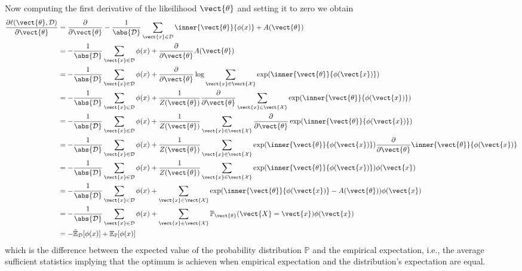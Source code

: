     Now computing the first derivative of the likeilihood \wrt $\vect{\theta}$ and setting it to zero we obtain
    \begin{equation}
        \label{eq:likelihood_der}
        \begin{split}
            \frac{\partial \ell(\vect{\theta}, \mathcal{D})}{\partial \vect{\theta}} &=  \frac{\partial}{\partial \vect{\theta}}  - \frac{1}{\abs{\mathcal{D}}} \sum_{\vect{x} \in \mathcal{D}} \inner{\vect{\theta}}{\phi(x)} + A(\vect{\theta})\\
            &= - \frac{1}{\abs{\mathcal{D}}}  \sum_{\vect{x} \in \mathcal{D}} \phi(x) +  \frac{\partial}{\partial \vect{\theta}}  A(\vect{\theta}) \\
            &= - \frac{1}{\abs{\mathcal{D}}}  \sum_{\vect{x} \in \mathcal{D}} \phi(x) +  \frac{\partial}{\partial \vect{\theta}}  \log \sum_{\vect{x} \in \vect{\mathcal{X}}} \exp(\inner{\vect{\theta}}{\phi(\vect{x})})\\
            &= - \frac{1}{\abs{\mathcal{D}}}  \sum_{\vect{x} \in \mathcal{D}} \phi(x) +  \frac{1}{Z(\vect{\theta})}\frac{\partial}{\partial \vect{\theta}}  \sum_{\vect{x} \in \vect{\mathcal{X}}} \exp(\inner{\vect{\theta}}{\phi(\vect{x})})\\
            &= - \frac{1}{\abs{\mathcal{D}}}  \sum_{\vect{x} \in \mathcal{D}} \phi(x) +  \frac{1}{Z(\vect{\theta})} \sum_{\vect{x} \in \vect{\mathcal{X}}}  \frac{\partial}{\partial \vect{\theta}}  \exp(\inner{\vect{\theta}}{\phi(\vect{x})})\\
            &= - \frac{1}{\abs{\mathcal{D}}}  \sum_{\vect{x} \in \mathcal{D}} \phi(x) +  \frac{1}{Z(\vect{\theta})} \sum_{\vect{x} \in \vect{\mathcal{X}}} \exp(\inner{\vect{\theta}}{\phi(\vect{x})}) \frac{\partial}{\partial \vect{\theta}}  \inner{\vect{\theta}}{\phi(\vect{x})}\\
            &= - \frac{1}{\abs{\mathcal{D}}}  \sum_{\vect{x} \in \mathcal{D}} \phi(x) +  \frac{1}{Z(\vect{\theta})} \sum_{\vect{x} \in \vect{\mathcal{X}}} \exp(\inner{\vect{\theta}}{\phi(\vect{x})}) \phi(\vect{x})\\
            &= - \frac{1}{\abs{\mathcal{D}}}  \sum_{\vect{x} \in \mathcal{D}} \phi(x) + \sum_{\vect{x} \in \vect{\mathcal{X}}} \exp(\inner{\vect{\theta}}{\phi(\vect{x})} - A(\vect{\theta})) \phi(\vect{x})\\
            &= - \frac{1}{\abs{\mathcal{D}}}  \sum_{\vect{x} \in \mathcal{D}} \phi(x) + \sum_{\vect{x} \in \vect{\mathcal{X}}} \mathbb{P}_{\vect{\theta}}(\vect{X} = \vect{x}) \phi(\vect{x})\\
            &=  - \tilde{\mathbb{E}}_{\mathcal{D}}[\phi(x)] + \mathbb{E}_{\mathbb{P}}[\phi(x)]
        \end{split}
    \end{equation}
    which is the difference between the expected value of the probability distribution $\mathbb{P}$ and the empirical expectation, i.e., the average sufficient statistics implying that the optimum is achieven when empirical expectation and the distribution's expectation are equal.

